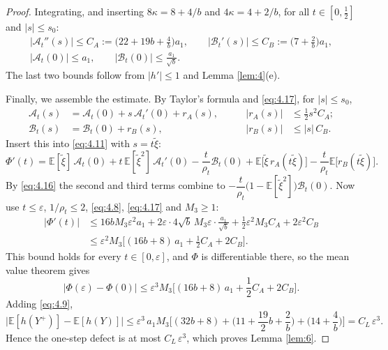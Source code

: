 \documentclass[aip,jmp,preprint,onecolumn,floatfix,superscriptaddress,nofootinbib,11pt]{revtex4-2}
\theoremstyle{plain}
\theoremstyle{remark}
\numberwithin{equation}{section}
\newcommand{\E}{\mathbb{E}}
\newcommand{\eps}{\varepsilon}
\begin{document}
\begin{proof}
Integrating, and inserting $8\kappa=8+4/b$ and $4\kappa=4+2/b$, for all $t\in[0,\tfrac12]$ and $|s|\le s_0$:
%   
\begin{equation}
\begin{gathered} |\mathcal A_t''(s)|\le C_A:=\Big(22+19b+\frac4b\Big)a_1,\qquad |\mathcal B_t'(s)|\le C_B:=\Big(7+\frac2b\Big)a_1,\\[4pt] |\mathcal A_t(0)|\le a_1,\qquad |\mathcal B_t(0)|\le\frac{a_1}{\sqrt b}. \end{gathered}
\label{eq:4.17}
\end{equation}
%
The last two bounds follow from $|h'|\le1$ and Lemma \ref{lem:4}(e).
 
Finally, we assemble the estimate. By Taylor's formula and \eqref{eq:4.17}, for $|s|\le s_0$,
%
\begin{equation*}
\begin{aligned} \mathcal A_t(s)&=\mathcal A_t(0)+s\,\mathcal A_t'(0)+r_A(s),&\qquad |r_A(s)|&\le\tfrac12s^{2}C_A;\\[4pt] \mathcal B_t(s)&=\mathcal B_t(0)+r_B(s),&\qquad |r_B(s)|&\le|s|\,C_B . \end{aligned}
\end{equation*}
%
Insert this into \eqref{eq:4.11} with $s=t\tilde\xi$:
%
\begin{equation*}
\Phi'(t)=\E[\tilde\xi]\,\mathcal A_t(0)+t\,\E[\tilde\xi^{2}]\,\mathcal A_t'(0)-\frac{t}{\rho_t}\mathcal B_t(0)+\E\big[\tilde\xi\,r_A(t\tilde\xi)\big]-\frac{t}{\rho_t}\E\big[r_B(t\tilde\xi)\big].
\end{equation*}
%
By \eqref{eq:4.16} the second and third terms combine to $-\dfrac{t}{\rho_t}\big(1-\E[\tilde\xi^{2}]\big)\mathcal B_t(0)$. Now use $t\le\eps$, $1/\rho_t\le2$, \eqref{eq:4.8}, \eqref{eq:4.17} and $M_3\ge1$:
%
\begin{equation*}
\begin{aligned} |\Phi'(t)|&\le16bM_3\eps^{2}a_1+2\eps\cdot4\sqrt b\,M_3\eps\cdot\frac{a_1}{\sqrt b}+\frac12\eps^{2}M_3C_A+2\eps^{2}C_B\\[4pt] &\le\eps^{2}M_3\Big[(16b+8)\,a_1+\frac12C_A+2C_B\Big]. \end{aligned}
\end{equation*}
%
This bound holds for every $t\in[0,\eps]$, and $\Phi$ is differentiable there, so the mean value theorem gives
%
\begin{equation*}
|\Phi(\eps)-\Phi(0)|\le\eps^{3}M_3\Big[(16b+8)\,a_1+\frac12C_A+2C_B\Big].
\end{equation*}
%
Adding \eqref{eq:4.9},
%
\begin{equation*}
\big|\E[h(Y^{+})]-\E[h(Y)]\big|\le\eps^{3}\,a_1M_3\Big[(32b+8)+\Big(11+\frac{19}{2}b+\frac2b\Big)+\Big(14+\frac4b\Big)\Big]=C_L\,\eps^{3}.
\end{equation*}
%
Hence the one-step defect is at most $C_L\,\eps^{3}$, which proves Lemma \ref{lem:6}.
 
\end{proof}
 
\end{document}
